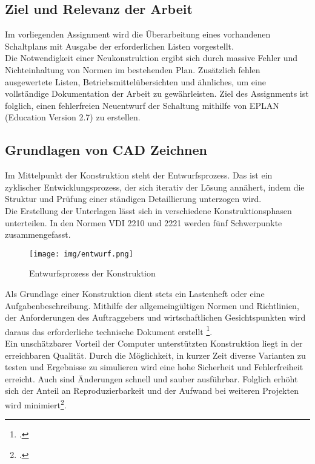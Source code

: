 \documentclass[12pt,a4paper]{scrartcl}	%
\begin{document}
\subsection{Ziel und Relevanz der Arbeit}
Im vorliegenden Assignment wird die Überarbeitung eines vorhandenen Schaltplans mit Ausgabe der erforderlichen Listen vorgestellt.\\
Die Notwendigkeit einer Neukonstruktion ergibt sich durch massive Fehler und Nichteinhaltung von Normen im bestehenden Plan. Zusätzlich fehlen ausgewertete Listen, Betriebsmittelübersichten und ähnliches, um eine vollständige Dokumentation der Arbeit zu gewährleisten. Ziel des Assignments ist folglich, einen fehlerfreien Neuentwurf der Schaltung mithilfe von EPLAN (Education Version 2.7) zu erstellen. 



\subsection{Grundlagen von CAD Zeichnen}
Im Mittelpunkt der Konstruktion steht der Entwurfsprozess.
Das ist ein zyklischer Entwicklungsprozess, der sich iterativ der Lösung annähert, indem die Struktur und Prüfung einer ständigen Detaillierung unterzogen wird.\\
Die Erstellung der Unterlagen lässt sich in verschiedene Konstruktionsphasen unterteilen.
In den Normen VDI 2210 und 2221 werden fünf Schwerpunkte zusammengefasst.
\begin{figure}[htb]
	\centering
	\texttt{[image: img/entwurf.png]}
	\caption[Entwurfsprozess der Konstruktion]{Entwurfsprozess der Konstruktion\footnotemark}
\end{figure}
Als Grundlage einer Konstruktion dient stets ein Lastenheft oder eine Aufgabenbeschreibung. Mithilfe der allgemeingültigen Normen und Richtlinien, der Anforderungen des Auftraggebers und wirtschaftlichen Gesichtspunkten wird daraus das erforderliche technische Dokument erstellt \footcitetext[vgl][S. 4]{grund}.\\
Ein unschätzbarer Vorteil der Computer unterstützten Konstruktion liegt in der erreichbaren Qualität. Durch die Möglichkeit, in kurzer Zeit diverse Varianten zu testen und Ergebnisse zu simulieren wird eine hohe Sicherheit und Fehlerfreiheit erreicht. Auch sind Änderungen schnell und sauber ausführbar. Folglich erhöht sich der Anteil an Reproduzierbarkeit und der Aufwand bei weiteren Projekten wird minimiert\footcite[vgl.][S. 23]{leiter}.
\end{document}
